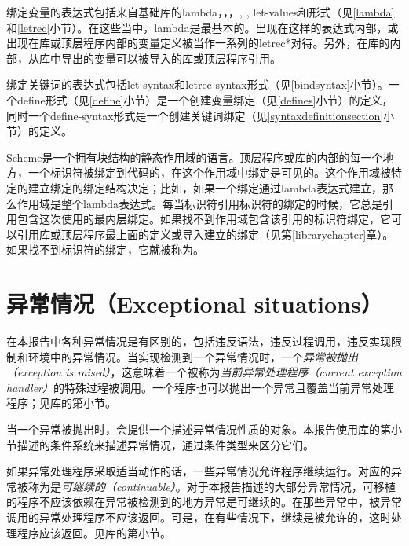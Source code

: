 绑定变量的表达式包括来自基础库的{\cf lambda}，，，, ,\allowbreak{} {\cf let-values}\allowbreak{}和\allowbreak{}形式（见\ref{lambda}和\ref{letrec}小节）。在这些当中，{\cf lambda}是最基本的。出现在这样的表达式内部，或出现在库或顶层程序内部的变量定义被当作一系列的{\cf letrec*}对待。另外，在库的内部，从库中导出的变量可以被导入的库或顶层程序引用。

绑定关键词的表达式包括{\cf let-syntax}和{\cf letrec-syntax}形式（见\ref{bindsyntax}小节）。一个{\cf define}形式（见\ref{define}小节）是一个创建变量绑定（见\ref{defines}小节）的定义，同时一个{\cf define-syntax}形式是一个创建关键词绑定（见\ref{syntaxdefinitionsection}小节）的定义。

\vest Scheme是一个拥有块结构的静态作用域的语言。顶层程序或库的内部的每一个地方，一个标识符被绑定到代码的，在这个作用域中绑定是可见的。这个作用域被特定的建立绑定的绑定结构决定；比如，如果一个绑定通过{\cf lambda}表达式建立，那么作用域是整个{\cf lambda}表达式。每当标识符引用标识符的绑定的时候，它总是引用包含这次使用的最内层绑定。如果找不到作用域包含该引用的标识符绑定，它可以引用库或顶层程序最上面的定义或导入建立的绑定（见第\ref{librarychapter}章）。如果找不到标识符的绑定，它就被称为。

\section{异常情况（Exceptional situations）}
\label{exceptionalsituationsection}

在本报告中各种异常情况是有区别的，包括违反语法，违反过程调用，违反实现限制和环境中的异常情况。当实现检测到一个异常情况时，一个\textit{异常被抛出（exception is raised）}，这意味着一个被称为\textit{当前异常处理程序（current exception handler）}的特殊过程被调用。一个程序也可以抛出一个异常且覆盖当前异常处理程序；见库的第小节。

当一个异常被抛出时，会提供一个描述异常情况性质的对象。本报告使用库的第小节描述的条件系统来描述异常情况，通过条件类型来区分它们。

如果异常处理程序采取适当动作的话，一些异常情况允许程序继续运行。对应的异常被称为是\textit{可继续的（continuable）}。对于本报告描述的大部分异常情况，可移植的程序不应该依赖在异常被检测到的地方异常是可继续的。在那些异常中，被异常调用的异常处理程序不应该返回。可是，在有些情况下，继续是被允许的，这时处理程序应该返回。见库的第小节。

